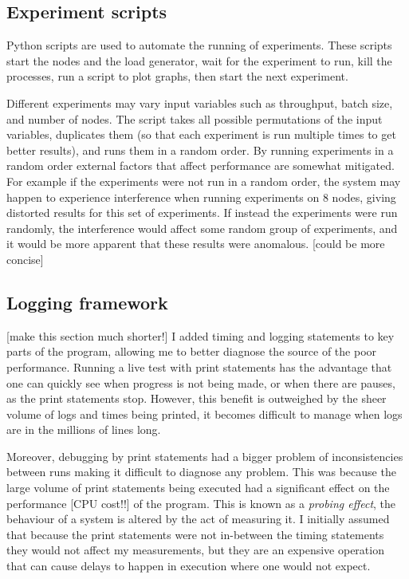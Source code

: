 \subsection{Experiment scripts} \label{experimentscripts}
Python scripts are used to automate the running of experiments. These scripts start the nodes and the load generator, wait for the experiment to run, kill the processes, run a script to plot graphs, then start the next experiment.

Different experiments may vary input variables such as throughput, batch size, and number of nodes. The script takes all possible permutations of the input variables, duplicates them (so that each experiment is run multiple times to get better results), and runs them in a random order. By running experiments in a random order external factors that affect performance are somewhat mitigated. For example if the experiments were not run in a random order, the system may happen to experience interference when running experiments on 8 nodes, giving distorted results for this set of experiments. If instead the experiments were run randomly, the interference would affect some random group of experiments, and it would be more apparent that these results were anomalous. [could be more concise]

\subsection{Logging framework}
[make this section much shorter!]
I added timing and logging statements to key parts of the program, allowing me to better diagnose the source of the poor performance. Running a live test with print statements has the advantage that one can quickly see when progress is not being made, or when there are pauses, as the print statements stop. However, this benefit is outweighed by the sheer volume of logs and times being printed, it becomes difficult to manage when logs are in the millions of lines long.

Moreover, debugging by print statements had a bigger problem of inconsistencies between runs making it difficult to diagnose any problem. This was because the large volume of print statements being executed had a significant effect on the performance [CPU cost!!] of the program. This is known as a \textit{probing effect}, the behaviour of a system is altered by the act of measuring it. I initially assumed that because the print statements were not in-between the timing statements they would not affect my measurements, but they are an expensive operation that can cause delays to happen in execution where one would not expect.

